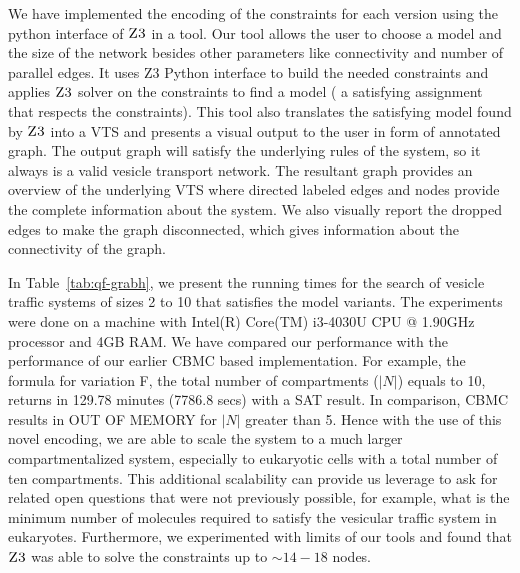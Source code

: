 
%

We have implemented the encoding of the constraints for each version
using the python interface of $\textsc{Z3}$ in a tool.
%
Our tool allows the user to choose a model and the size of the network
besides other parameters like connectivity and number of parallel
edges.
%
It uses Z3 Python interface to build the needed constraints and
applies $\textsc{Z3}$ solver on the constraints to find a model ( a
satisfying assignment that respects the constraints).
%
This tool also translates the satisfying model found by $\textsc{Z3}$ into
a VTS and presents a visual output to the user in form of annotated graph.
%
The output graph will satisfy the underlying rules of the system, so
it always is a valid vesicle transport network.
%
The resultant graph provides an overview of the underlying VTS
where directed labeled edges and nodes provide the
complete information about the system.
%
We also visually report the dropped edges to make the graph
disconnected, which gives information about the connectivity of the
graph.




In Table~\ref{tab:qf-grabh}, we present the running times for the search of
vesicle traffic systems of sizes 2 to 10 that satisfies the model
variants.
%
The experiments were done on a machine with Intel(R) Core(TM) i3-4030U
CPU @ 1.90GHz processor and 4GB RAM.
%
We have compared our performance with the performance of our earlier 
CBMC based implementation.
%
For example, the formula for variation F, the total number of
compartments ($|N|$) equals to 10, returns in 129.78 minutes (7786.8 secs)
with a SAT result.
%
In comparison, CBMC results in OUT OF MEMORY for $|N|$ greater than 5.
%
Hence with the use of this novel encoding, we are able to scale the
system to a much larger compartmentalized system, especially to
eukaryotic cells with a total number of ten compartments.
%
This additional scalability can provide us leverage to ask for related
open questions that were not previously possible, for example, what is
the minimum number of molecules required to satisfy the vesicular
traffic system in eukaryotes.
%
Furthermore, we experimented with limits of our tools and found
that $\textsc{Z3}$ was able to solve the constraints up to $\sim{14-18}$ nodes.



